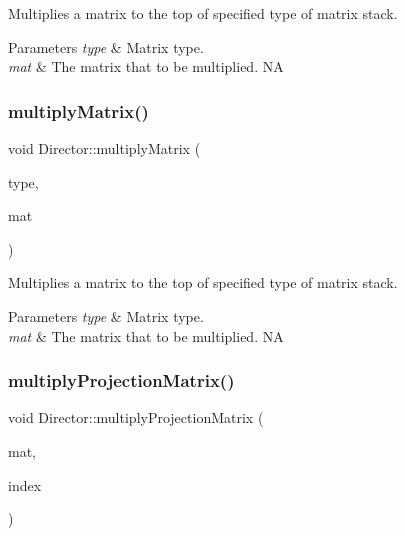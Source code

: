 Multiplies a matrix to the top of specified type of matrix stack.


\begin{DoxyParams}{Parameters}
{\em type} & Matrix type. \\
\hline
{\em mat} & The matrix that to be multiplied.  NA \\
\hline
\end{DoxyParams}
\mbox{\label{classDirector_aec8693e208a9eeb95de9b4c6af300444}} 
\subsubsection{\texorpdfstring{multiply\+Matrix()}{multiplyMatrix()}\hspace{0.1cm}{\footnotesize\ttfamily [2/2]}}
{\footnotesize\ttfamily void Director\+::multiply\+Matrix (\begin{DoxyParamCaption}\item[{\hyperlink{group__base_ga4d146cef7130a8f3a953d46964ea3905}{M\+A\+T\+R\+I\+X\+\_\+\+S\+T\+A\+C\+K\+\_\+\+T\+Y\+PE}}]{type,  }\item[{const \hyperlink{classMat4}{Mat4} \&}]{mat }\end{DoxyParamCaption})}

Multiplies a matrix to the top of specified type of matrix stack.


\begin{DoxyParams}{Parameters}
{\em type} & Matrix type. \\
\hline
{\em mat} & The matrix that to be multiplied.  NA \\
\hline
\end{DoxyParams}
\mbox{\label{classDirector_ad54a2ecc7e0d4f15388350954aaf4d6f}} 
\subsubsection{\texorpdfstring{multiply\+Projection\+Matrix()}{multiplyProjectionMatrix()}}
{\footnotesize\ttfamily void Director\+::multiply\+Projection\+Matrix (\begin{DoxyParamCaption}\item[{const \hyperlink{classMat4}{Mat4} \&}]{mat,  }\item[{size\+\_\+t}]{index }\end{DoxyParamCaption})}

